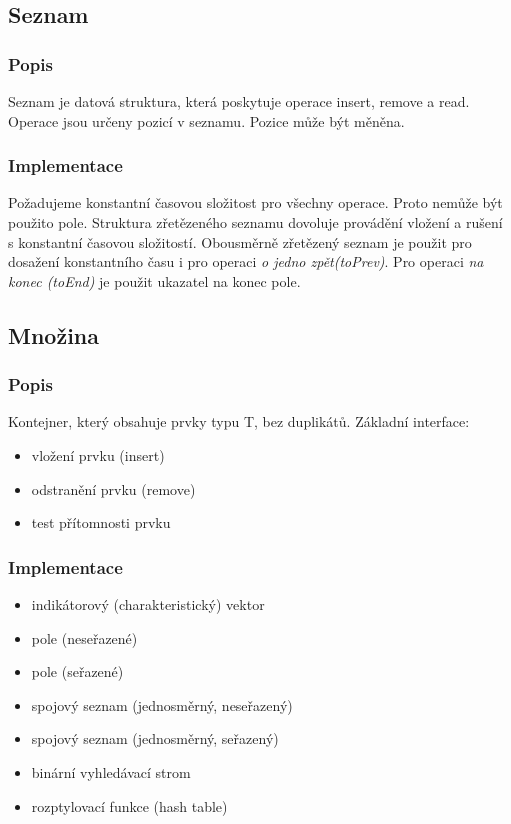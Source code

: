 \documentclass{szzclass}
\begin{document}
\subsection{Seznam}
\subsubsection{Popis}
Seznam je datová struktura, která poskytuje operace insert, remove a read. Operace jsou určeny pozicí v seznamu. Pozice může být měněna.
\subsubsection{Implementace}
Požadujeme konstantní časovou složitost pro všechny operace. Proto nemůže být použito pole. Struktura zřetězeného seznamu dovoluje provádění vložení
a rušení s konstantní časovou složitostí. Obousměrně zřetězený seznam je použit pro dosažení konstantního času i pro operaci \textit{o jedno zpět(toPrev)}.
Pro operaci \textit{na konec (toEnd)} je použit ukazatel na konec pole.

\subsection{Množina}
\subsubsection{Popis}
Kontejner, který obsahuje prvky typu T, bez duplikátů. Základní interface:
\begin{itemize}
    \item vložení prvku (insert)
    \item odstranění prvku (remove)
    \item test přítomnosti prvku
\end{itemize}
\subsubsection{Implementace}
\begin{itemize}
    \item indikátorový (charakteristický) vektor
    \item pole (neseřazené)
    \item pole (seřazené)
    \item spojový seznam (jednosměrný, neseřazený)
    \item spojový seznam (jednosměrný, seřazený)
    \item binární vyhledávací strom
    \item rozptylovací funkce (hash table)
\end{itemize}
\end{document}

